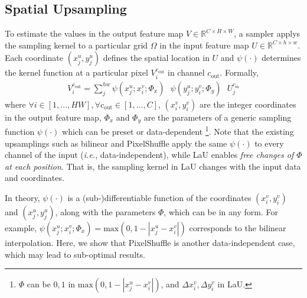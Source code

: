 \documentclass[10pt,twocolumn,letterpaper]{article}
\begin{document}
\subsection{Spatial Upsampling}
To estimate the values in the output feature map $V\in\mathbb{R}^{C\times H\times W}$, a sampler applys the sampling kernel to a particular grid $\Omega$ in the input feature map $U\in\mathbb{R}^{C\times h\times w}$. Each coordinate $(x_j^u,y_j^u)$ defines the spatial location in $U$ and $\psi(\cdot)$ determines the kernel function at a particular pixel $V_i^{c_{\text{out}}}$ in channel $c_{\text{out}}$.  Formally, 
\begin{align}
V_i^{c_{\text{out}}}=\sum_{j}^{hw}\psi(x_j^u;x_i^v;\Phi_x)\text{ }\psi(y_j^u;y_i^v;\Phi_y)\text{ }U_j^{c_{\text{in}}}
\label{eq:1}
\end{align} 
where $\forall i\in[1,...,HW],\forall c_{\text{out}}\in[1,...,C]$, $(x_i^v,y_i^v)$ are the integer coordinates in the output feature map, $\Phi_x$ and $\Phi_y$ are the parameters of a generic sampling function $\psi(\cdot)$ which can be preset or data-dependent \footnote{$\Phi$ can be $0,1$ in $\text{max}(0,1-|x_j^u-x_i^v|)$, and $\Delta x_i^v,\Delta y_i^v$ in LaU.}. Note that the existing upsamplings such as bilinear and PixelShuffle apply the same $\psi(\cdot)$ to every channel of the input (\textit{i.e.}, data-independent), while LaU enables \textit{free changes of $\Phi$ at each position}. That is, the sampling kernel in LaU changes with the input data and coordinates.

In theory, $\psi(\cdot)$ is a (sub-)differentiable function of the coordinates $(x_i^v,y_i^v)$ and $(x_j^u,y_j^u)$, along with the parameters $\Phi$, which can be in any form. For example, $\psi(x_j^u;x_i^v;\Phi_x)=\text{max}(0,1-|x_j^u-x_i^v|)$ corresponds to the bilinear interpolation. Here, we show that PixelShuffle is another data-independent case, which may lead to sub-optimal results.
\end{document}
